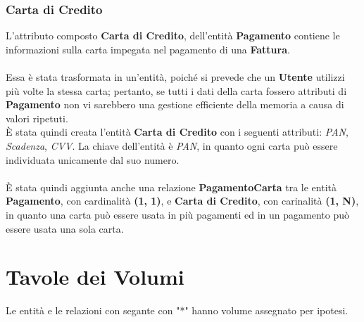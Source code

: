 \documentclass{article}
\begin{document}
\subsubsection{Carta di Credito}
L'attributo composto \textbf{Carta di Credito}, dell'entità \textbf{Pagamento} contiene le informazioni sulla carta impegata nel pagamento di una \textbf{Fattura}.
\\
\\
%
%
%
%
%
%
%
%
Essa è stata trasformata in un'entità, poiché si prevede che un \textbf{Utente} utilizzi più volte la stessa carta; pertanto, se tutti i dati della carta fossero attributi di \textbf{Pagamento} non vi sarebbero una gestione efficiente della memoria a causa di valori ripetuti.
\\
È stata quindi creata l'entità \textbf{Carta di Credito} con i seguenti attributi: \textit{PAN}, \textit{Scadenza}, \textit{CVV}. La chiave dell'entità è \textit{PAN}, in quanto ogni carta può essere individuata unicamente dal suo numero.
\\
\\
È stata quindi aggiunta anche una relazione \textbf{PagamentoCarta} tra le entità \textbf{Pagamento}, con cardinalità \textbf{(1, 1)}, e \textbf{Carta di Credito}, con carinalità \textbf{(1, N)}, in quanto una carta può essere usata in più pagamenti ed in un pagamento può essere usata una sola carta.

\newpage
%
%
%
%
%
%
%
%
\section{Tavole dei Volumi}


Le entità e le relazioni con segante con "*" hanno volume assegnato per ipotesi.
\end{document}
